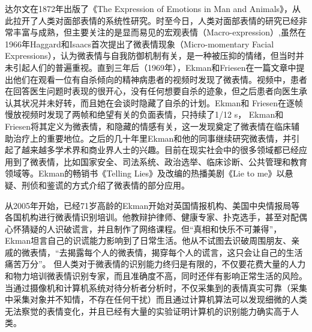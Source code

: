 达尔文在1872年出版了《The Expression of Emotions in Man and Animals》，从此拉开了人类对面部表情的系统性研究。时至今日，人类对面部表情的研究已经非常丰富与成熟，但主要关注的是显而易见的宏观表情（Macro-expression）,虽然在1966年Haggard和Isaacs首次提出了微表情现象（Micro-momentary Facial Expressions），认为微表情与自我防御机制有关，是一种被压抑的情绪，但当时并未引起人们的普遍重视。直到三年后（1969年），Ekman和Friesen在一篇文章中提出他们在观看一位有自杀倾向的精神病患者的视频时发现了微表情。视频中，患者在回答医生问题时表现的很开心，没有任何想要自杀的迹象，但之后患者向医生承认其状况并未好转，而且她在会谈时隐藏了自杀的计划。Ekman和 Friesen在逐帧慢放视频时发现了两帧和绝望有关的负面表情，只持续了1/12 s， Ekman和 Friesen将其定义为微表情，和隐藏的情感有关，这一发现奠定了微表情在临床辅助治疗上的重要地位。之后的几十年里Ekman和他的同事继续研究微表情，并引起了越来越多学术界和商业界人士的兴趣。目前在现实社会中的很多领域都已经应用到了微表情，比如国家安全、司法系统、政治选举、临床诊断、公共管理和教育领域等。Ekman的畅销书《Telling Lies》及改编的热播美剧《Lie to me》以悬疑、刑侦和鉴谎的方式介绍了微表情的部分应用。

 从2005年开始，已经71岁高龄的Ekman开始对英国情报机构、美国中央情报局等各国机构进行微表情识别培训。他教辩护律师、健康专家、扑克选手，甚至对配偶心怀猜疑的人识破谎言，并且制作了网络课程。但“真相和快乐不可兼得”，Ekman坦言自己的识谎能力影响到了日常生活。他从不试图去识破周围朋友、亲戚的微表情，“去揭露每个人的微表情，揭穿每个人的谎言，这只会让自己的生活痛苦万分”。  但人类对于微表情的识别能力终归是有限的，不仅要花费大量的人力和物力培训微表情识别专家，而且准确度不高，同时还伴有影响正常生活的风险。当通过摄像机和计算机系统对待分析者分析时，不仅采集到的表情真实可靠（采集中采集对象并不知情，不存在任何干扰）而且通过计算机算法可以发现细微的人类无法察觉的表情变化，并且已经有大量的实验证明计算机的识别能力确实高于人类。

